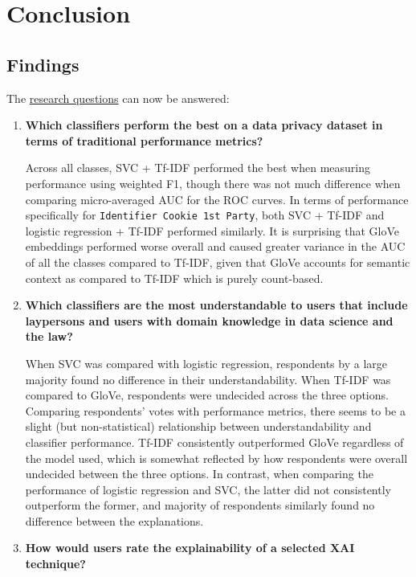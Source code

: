 \chapter{Conclusion} %
\label{chapter5} %

\section{Findings}
The \hyperref[chap1:research_questions]{research questions} can now be answered:
\begin{enumerate}[listparindent=0.5cm]
    \item \textbf{Which classifiers perform the best on a data privacy dataset in terms of traditional performance metrics?}
    
    Across all classes, SVC + Tf-IDF performed the best when measuring performance using weighted F1, though there was not much difference when comparing micro-averaged AUC for the ROC curves. In terms of performance specifically for \texttt{Identifier Cookie 1st Party}, both SVC + Tf-IDF and logistic regression + Tf-IDF performed similarly. It is surprising that GloVe embeddings performed worse overall and caused greater variance in the AUC of all the classes compared to Tf-IDF, given that GloVe accounts for semantic context as compared to Tf-IDF which is purely count-based.

    \item \textbf{Which classifiers are the most understandable to users that include laypersons and users with domain knowledge in data science and the law?}
    
    When SVC was compared with logistic regression, respondents by a large majority found no difference in their understandability. When Tf-IDF was compared to GloVe, respondents were undecided across the three options. Comparing respondents' votes with performance metrics, there seems to be a slight (but non-statistical) relationship between understandability and classifier performance. Tf-IDF consistently outperformed GloVe regardless of the model used, which is somewhat reflected by how respondents were overall undecided between the three options. In contrast, when comparing the performance of logistic regression and SVC, the latter did not consistently outperform the former, and majority of respondents similarly found no difference between the explanations.

    \item \textbf{How would users rate the explainability of a selected XAI technique?}
    

\end{enumerate}
